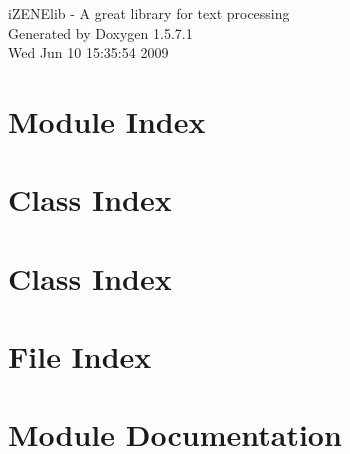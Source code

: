 \documentclass[a4paper]{book}
\begin{document}
\begin{titlepage}
\vspace*{7cm}
\begin{center}
{\Large iZENElib - A great library for text processing }\\
\vspace*{1cm}
{\large Generated by Doxygen 1.5.7.1}\\
\vspace*{0.5cm}
{\small Wed Jun 10 15:35:54 2009}\\
\end{center}
\end{titlepage}
\clearemptydoublepage
{}
\tableofcontents
\clearemptydoublepage
{}
\chapter{Module Index}

\chapter{Class Index}

\chapter{Class Index}

\chapter{File Index}

\chapter{Module Documentation}


\end{document}
